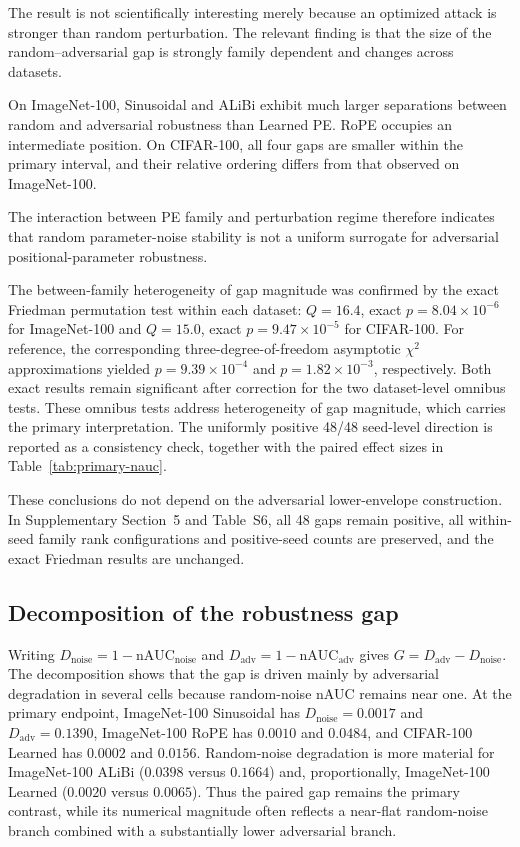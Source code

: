 \documentclass[preprint,12pt,authoryear]{elsarticle}
\begin{document}
The result is not scientifically interesting merely because an optimized
attack is stronger than random perturbation. The relevant finding is that
the size of the random--adversarial gap is strongly family dependent and
changes across datasets.

On ImageNet-100, Sinusoidal and ALiBi exhibit much larger separations
between random and adversarial robustness than Learned PE. RoPE occupies
an intermediate position. On CIFAR-100, all four gaps are smaller within
the primary interval, and their relative ordering differs from that
observed on ImageNet-100.

The interaction between PE family and perturbation regime therefore
indicates that random parameter-noise stability is not a uniform surrogate
for adversarial positional-parameter robustness.

The between-family heterogeneity of gap magnitude was confirmed by the
exact Friedman permutation test within each dataset: $Q=16.4$, exact
$p=8.04\times10^{-6}$ for ImageNet-100 and $Q=15.0$, exact
$p=9.47\times10^{-5}$ for CIFAR-100. For reference, the corresponding
three-degree-of-freedom asymptotic $\chi^2$ approximations yielded
$p=9.39\times10^{-4}$ and $p=1.82\times10^{-3}$, respectively. Both exact
results remain significant after correction for the two dataset-level
omnibus tests. These omnibus tests address heterogeneity of gap magnitude, which carries the
primary interpretation. The uniformly positive 48/48 seed-level direction is
reported as a consistency check, together with the paired effect sizes in
Table~\ref{tab:primary-nauc}.

These conclusions do not depend on the adversarial lower-envelope
construction. In Supplementary Section~5 and Table~S6, all
48 gaps remain positive, all within-seed family rank configurations and
positive-seed counts are preserved, and the exact Friedman results are
unchanged.

\subsection{Decomposition of the robustness gap}
\label{subsec:gap-decomposition}

Writing $D_{\mathrm{noise}}=1-\mathrm{nAUC}_{\mathrm{noise}}$ and
$D_{\mathrm{adv}}=1-\mathrm{nAUC}_{\mathrm{adv}}$ gives
$G=D_{\mathrm{adv}}-D_{\mathrm{noise}}$. The decomposition shows that the
gap is driven mainly by adversarial degradation in several cells because
random-noise nAUC remains near one. At the primary endpoint, ImageNet-100
Sinusoidal has $D_{\mathrm{noise}}=0.0017$ and
$D_{\mathrm{adv}}=0.1390$, ImageNet-100 RoPE has $0.0010$ and $0.0484$,
and CIFAR-100 Learned has $0.0002$ and $0.0156$. Random-noise degradation is
more material for ImageNet-100 ALiBi ($0.0398$ versus $0.1664$) and,
proportionally, ImageNet-100 Learned ($0.0020$ versus $0.0065$). Thus the
paired gap remains the primary contrast, while its numerical magnitude often
reflects a near-flat random-noise branch combined with a substantially lower
adversarial branch.
\end{document}
